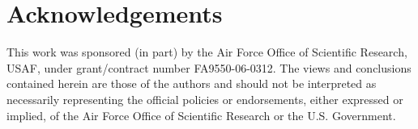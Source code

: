 \section{Acknowledgements}
This work was sponsored (in part) by the Air Force Office of Scientific Research, USAF, 
under grant/contract number FA9550-06-0312.  The views and conclusions contained herein 
are those of the authors and should not be interpreted as necessarily representing the 
official policies or endorsements, either expressed or implied, of the Air Force Office 
of Scientific Research or the U.S. Government.
